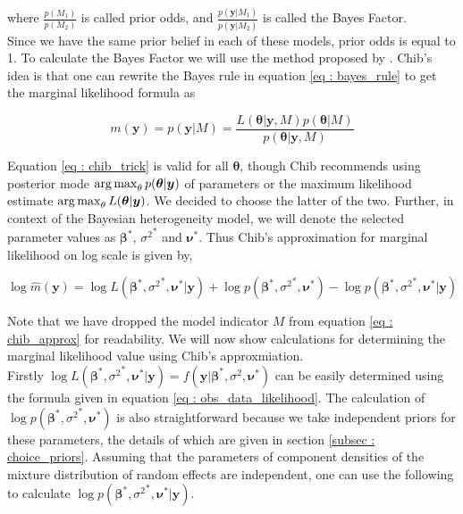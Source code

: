 where $\frac {p(M_1)}{p(M_2)}$ is called prior odds, and $\frac {p(\boldsymbol{y}|M_1)} {p(\boldsymbol{y}|M_2)}$ is called the Bayes Factor.\\

Since we have the same prior belief in each of these models, prior odds is equal to 1. To calculate the Bayes Factor we will use the method proposed by \citet{chib_marginal_1995}. Chib's idea is that one can rewrite the Bayes rule in equation \ref{eq : bayes_rule} to get the marginal likelihood formula as

\begin{equation}
\label{eq : chib_trick}
m(\boldsymbol{y}) = p(\boldsymbol{y}|M) = \dfrac {L(\boldsymbol{\theta}|\boldsymbol{y}, M) p(\boldsymbol{\theta}|M)} {p(\boldsymbol{\theta}|\boldsymbol{y}, M)}
\end{equation}

Equation \ref{eq : chib_trick} is valid for all $\boldsymbol{\theta}$, though Chib recommends using posterior mode $\operatorname*{arg\,max}_\theta p(\boldsymbol{\theta}|\boldsymbol{y})$ of parameters or the maximum likelihood estimate $\operatorname*{arg\,max}_\theta L(\boldsymbol{\theta}|\boldsymbol{y})$. We decided to choose the latter of the two. Further, in context of the Bayesian heterogeneity model, we will denote the selected parameter values as ${\boldsymbol{\beta}}^*$, ${\sigma^2}^*$ and $\boldsymbol{\nu}^*$. Thus Chib's approximation for marginal likelihood on log scale is given by,

\begin{equation}
\label{eq : chib_approx}
\log{\hat{m}(\boldsymbol{y})} = \log{L({\boldsymbol{\beta}}^*, {\sigma^2}^*, \boldsymbol{\nu}^*|\boldsymbol{y})} + \log{p({\boldsymbol{\beta}}^*, {\sigma^2}^*, \boldsymbol{\nu}^*)} - \log{p({\boldsymbol{\beta}}^*, {\sigma^2}^*, \boldsymbol{\nu}^*|\boldsymbol{y})}
\end{equation}

Note that we have dropped the model indicator $M$ from equation \ref{eq : chib_approx} for readability. We will now show calculations for determining the marginal likelihood value using Chib's approxmiation.\\ 

Firstly $\log{L({\boldsymbol{\beta}}^*, {\sigma^2}^*, \boldsymbol{\nu}^*|\boldsymbol{y})} = f(\boldsymbol{y}|{\boldsymbol{\beta}}^*, \sigma^2, {\boldsymbol{\nu}}^*)$ can be easily determined using the formula given in equation \ref{eq : obs_data_likelihood}. The calculation of $\log{p({\boldsymbol{\beta}}^*, {\sigma^2}^*, \boldsymbol{\nu}^*)}$ is also straightforward because we take independent priors for these parameters, the details of which are given in section \ref{subsec : choice_priors}. Assuming that the parameters of component densities of the mixture distribution of random effects are independent, one can use the following to calculate $\log{p({\boldsymbol{\beta}}^*, {\sigma^2}^*, \boldsymbol{\nu}^*|\boldsymbol{y})}$.

